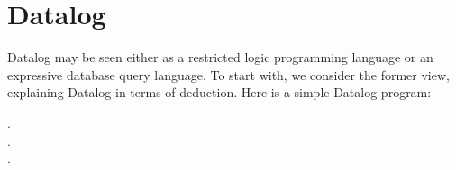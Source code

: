 









\section{Datalog}
\label{section-datalog}


Datalog may be seen either as a restricted logic programming language or an
expressive database query language. To start with, we consider the former view,
explaining Datalog in terms of deduction. Here is a simple Datalog program:

\nopagebreak[2]
\begin{datalog}
  .
  \\
  .
  \\
   \gets {} \conj {}.
\end{datalog}

